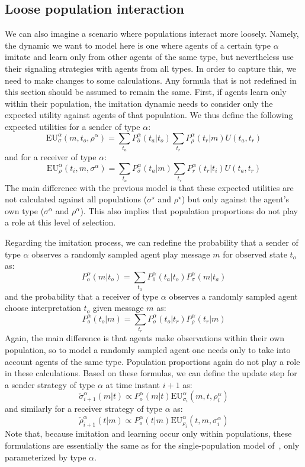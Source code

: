 \documentclass[a4paper]{article}
\begin{document}
\subsection{Loose population interaction}
\label{sec:loose-interaction-model}
We can also imagine a scenario where populations interact more loosely.
Namely, the dynamic we want to model here is one where agents of a certain type $\alpha$ imitate and learn only from other agents of the same type, but nevertheless use their signaling strategies with agents from all types.
In order to capture this, we need to make changes to some calculations.
Any formula that is not redefined in this section should be assumed to remain the same.
First, if agents learn only within their population, the imitation dynamic needs to consider only the expected utility against agents of that population.
We thus define the following expected utilities for a sender of type $\alpha$:
$$
\text{EU}_{\sigma}^{\alpha}(m,t_{o},\rho^{\alpha})=\sum_{t_{a}}P_{\bar{o}}^{\alpha}(t_{a}|t_{o})\sum_{t_{r}}P_{\rho}^{\alpha}(t_{r}|m)U(t_{a},t_{r})
$$
and for a receiver of type $\alpha$:
$$
\text{EU}_{\rho}^{\alpha}(t_{i},m,\sigma^{\alpha})=\sum_{t_{a}}P_{\bar{\sigma}}^{\alpha}(t_{a}|m)\sum_{t_{r}}P_{r}^{\alpha}(t_{r}|t_{i})U(t_{a},t_{r})
$$
The main difference with the previous model is that these expected utilities are not calculated against all populations ($\sigma^\star$ and $\rho^\star$) but only against the agent's own type ($\sigma^\alpha$ and $\rho^\alpha$).
This also implies that population proportions do not play a role at this level of selection.

Regarding the imitation process, we can redefine the probability that a sender of type $\alpha$ observes a randomly sampled agent play message $m$ for observed state $t_o$ as:
$$
P_{o}^{\alpha}(m|t_{o})=\sum_{t_{a}}P_{\bar{o}}^{\alpha}(t_{a}|t_{o})P_{\sigma}^{\alpha}(m|t_{a})
$$
and the probability that a receiver of type $\alpha$ observes a randomly sampled agent choose interpretation $t_o$ given message $m$ as:
$$
P_{o}^{\alpha}(t_{o}|m)=\sum_{t_{r}}P_{o}^{\alpha}(t_{o}|t_{r})P_{\rho}^{\alpha}(t_{r}|m)
$$
Again, the main difference is that agents make observations within their own population, so to model a randomly sampled agent one needs only to take into account agents of the same type.
Population proportions again do not play a role in these calculations.
Based on these formulas, we can define the update step for a sender strategy of type $\alpha$ at time instant $i+1$ as:
$$
\check{\sigma}_{i+1}^{\alpha}(m|t) \propto P_{o}^{\alpha}(m|t)\text{EU}_{\sigma_{i}}^{\alpha}(m,t,\rho_{i}^{\alpha})
$$
and similarly for a receiver strategy of type $\alpha$ as:
$$
\check{\rho}_{i+1}^{\alpha}(t|m) \propto P_{o}^{\alpha}(t|m)\text{EU}_{\rho_{i}}^{\alpha}(t,m,\sigma_{i}^{\alpha})
$$
Note that, because imitation and learning occur only within populations, these formulations are essentially the same as for the single-population model of~\textcite{franke_vagueness_2017}, only parameterized by type $\alpha$.
\end{document}
